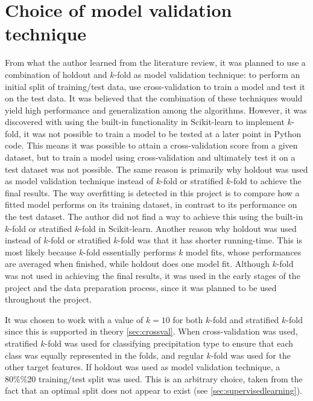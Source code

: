\section{Choice of model validation technique}
	From what the author learned from the literature review, it was planned to use a combination of holdout and $k$-fold as model validation technique: to perform an initial split of training/test data, use cross-validation to train a model and test it on the test data. It was believed that the combination of these techniques would yield high performance and generalization among the algorithms. However, it was discovered with using the built-in functionality in Scikit-learn to implement $k$-fold, it was not possible to train a model to be tested at a later point in Python code. This means it was possible to attain a cross-validation score from a given dataset, but to train a model using cross-validation and ultimately test it on a test dataset was not possible. The same reason is primarily why holdout was used as model validation technique instead of $k$-fold or stratified $k$-fold to achieve the final results. The way overfitting is detected in this project is to compare how a fitted model performs on its training dataset, in contrast to its performance on the test dataset. The author did not find a way to achieve this using the built-in $k$-fold or stratified $k$-fold in Scikit-learn. Another reason why holdout was used instead of $k$-fold or stratified $k$-fold was that it has shorter running-time. This is most likely because $k$-fold essentially performs $k$ model fits, whose performances are averaged when finished, while holdout does one model fit. Although $k$-fold was not used in achieving the final results, it was used in the early stages of the project and the data preparation process, since it was planned to be used throughout the project. 

	It was chosen to work with a value of $k= 10$ for both $k$-fold and stratified $k$-fold since this is supported in theory \ref{sec:crossval}. When cross-validation was used, stratified $k$-fold was used for classifying precipitation type to ensure that each class was equally represented in the folds, and regular $k$-fold was used for the other target features. If holdout was used as model validation technique, a 80\%\/\%20 training/test split was used. This is an arbitrary choice, taken from the fact that an optimal split does not appear to exist (see \ref{sec:supervisedlearning}).

